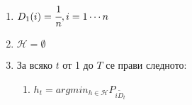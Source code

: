 \documentclass[main.tex]{subfiles}
\begin{document}
\begin{exampleenv}
	\begin{enumerate}
		\item $D_1(i) = \cfrac{1}{n}, i = 1\cdots n$
		\item $\mathcal{H} = \emptyset$
		\item За всяко $t$ от 1 до $T$ се прави следното:
		\begin{enumerate}
			\item $h_t = argmin_{h\in \mathcal{H}} P_{i\tilde D_t}$
		\end{enumerate}
	\end{enumerate}
\end{exampleenv}
\end{document}
